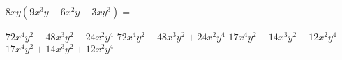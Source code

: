 
\question $8xy(9x^3y - 6x^2y - 3xy^3) = $

  \begin{oneparchoices}
    \CorrectChoice $72x^4y^2 - 48x^3y^2 - 24x^2y^4$
    \choice $72x^4y^2 + 48x^3y^2 + 24x^2y^4$
    \choice $17x^4y^2 - 14x^3y^2 - 12x^2y^4$
    \choice $17x^4y^2 + 14x^3y^2 + 12x^2y^4$
  \end{oneparchoices}
